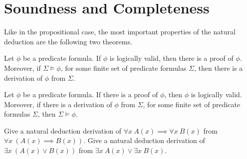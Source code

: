 \section{Soundness and Completeness}
Like in the propositional case, the most important properties of the natural
deduction are the following two theorems.

\begin{theorem}
    Let $\phi$ be a predicate formula. If $\phi$ is logically valid, then
    there is a proof of $\phi$. Moreover, if $\Sigma \models \phi$,
    for some finite set of predicate formulas $\Sigma$, then there is a
    derivation of $\phi$ from $\Sigma$.
\end{theorem}

\begin{theorem}
    Let $\phi$ be a predicate formula. If there is a proof of $\phi$, then
    $\phi$ is logically valid. Moreover, if there is a derivation of $\phi$ from
    $\Sigma$, for some finite set of predicate formulas $\Sigma$, then
    $\Sigma \models \phi$.
\end{theorem}

\begin{chapterendexercises}
  \exercise Give a natural deduction derivation of
    $\forall x \ A(x) \implies \forall x \ B(x)$ from
    $\forall x \ (A(x) \implies B(x))$.
  \exercise Give a natural deduction derivation of
    $\exists x \ ( A(x) \lor B(x))$ from
    $\exists x \  A(x) \lor \exists x \  B(x)$.
\end{chapterendexercises}
